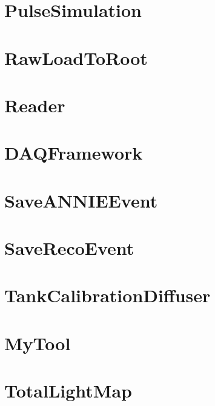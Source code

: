 \documentclass[twoside]{book}
\begin{document}
\chapter{Pulse\-Simulation}
\label{md_UserTools_PulseSimulation_README}
\hypertarget{md_UserTools_PulseSimulation_README}{}

\chapter{Raw\-Load\-To\-Root}
\label{md_UserTools_RawLoadToRoot_README}
\hypertarget{md_UserTools_RawLoadToRoot_README}{}

\chapter{Reader}
\label{md_UserTools_Reader_README}
\hypertarget{md_UserTools_Reader_README}{}

\chapter{D\-A\-Q\-Framework}
\label{md_UserTools_README}
\hypertarget{md_UserTools_README}{}

\chapter{Save\-A\-N\-N\-I\-E\-Event}
\label{md_UserTools_SaveANNIEEvent_README}
\hypertarget{md_UserTools_SaveANNIEEvent_README}{}

\chapter{Save\-Reco\-Event}
\label{md_UserTools_SaveRecoEvent_README}
\hypertarget{md_UserTools_SaveRecoEvent_README}{}

\chapter{Tank\-Calibration\-Diffuser}
\label{md_UserTools_TankCalibrationDiffuser_README}
\hypertarget{md_UserTools_TankCalibrationDiffuser_README}{}

\chapter{My\-Tool}
\label{md_UserTools_template_README}
\hypertarget{md_UserTools_template_README}{}

\chapter{Total\-Light\-Map}
\label{md_UserTools_TotalLightMap_README}
\hypertarget{md_UserTools_TotalLightMap_README}{}

\end{document}
